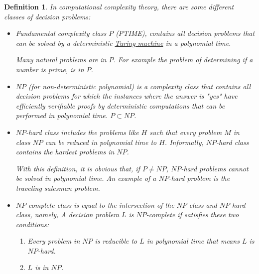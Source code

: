 \documentclass[12pt]{article}
\theoremstyle{slplain}
\newtheorem{defi}{Definition}
\begin{document}
\begin{defi}
In computational complexity theory, there are some different classes of decision problems:

\begin{itemize}
\item Fundamental complexity class $P$ (PTIME), contains all decision problems that can be solved by a deterministic \href{https://en.wikipedia.org/wiki/Turing_machine}{Turing machine}\cite{turing} in a polynomial time. 

Many natural problems are in $P$. For example the problem of determining if a number is prime, is in $P$\cite{manindra}.

\item $NP$ (for non-deterministic polynomial) is a complexity class that contains all decision problems for which the instances where the answer is "yes" have efficiently verifiable proofs by deterministic computations that can be performed in polynomial time. $P\subset NP$.

\item $NP$-hard class includes the problems like $H$ such that every problem $M$ in class $NP$ can be reduced in polynomial time to $H$. Informally, $NP$-hard class contains the hardest problems in $NP$. 

With this definition, it is obvious that, if $P \not= NP$, $NP$-hard problems cannot be solved in polynomial time. An example of a $NP$-hard problem is the traveling salesman problem.\cite{lawler}

\item $NP$-complete class is equal to the intersection of the $NP$ class and $NP$-hard class, namely, A decision problem $L$ is $NP$-complete if satisfies these two conditions:
\begin{enumerate}
\item Every problem in $NP$ is reducible to $L$ in polynomial time that means $L$ is $NP$-hard.

\item $L$ is in $NP$.
\end{enumerate}
\end{itemize}
\end{defi}
\end{document}
